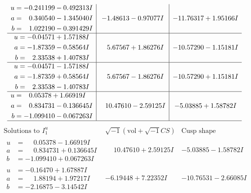 \documentclass[1p]{elsarticle_modified}
\theoremstyle{definition}
\newcommand{\I}{\sqrt{-1}}
\begin{document}
$$\begin{array}{c|c|c}
\begin{aligned}
u &= -0.241199 - 0.492313 I \\
a &= \phantom{-}0.340540 - 1.345040 I \\
b &= \phantom{-}1.022190 - 0.391429 I\end{aligned}
 & -1.48613 - 0.97077 I & -11.76317 + 1.95166 I \\ \hline\begin{aligned}
u &= -0.04571 + 1.57188 I \\
a &= -1.87359 - 0.58564 I \\
b &= \phantom{-}2.33538 + 1.40783 I\end{aligned}
 & \phantom{-}5.67567 + 1.86276 I & -10.57290 - 1.15181 I \\ \hline\begin{aligned}
u &= -0.04571 - 1.57188 I \\
a &= -1.87359 + 0.58564 I \\
b &= \phantom{-}2.33538 - 1.40783 I\end{aligned}
 & \phantom{-}5.67567 - 1.86276 I & -10.57290 + 1.15181 I \\ \hline\begin{aligned}
u &= \phantom{-}0.05378 + 1.66919 I \\
a &= \phantom{-}0.834731 - 0.136645 I \\
b &= -1.099410 - 0.067263 I\end{aligned}
 & \phantom{-}10.47610 - 2.59125 I & -5.03885 + 1.58782 I\\
 \hline 
 \end{array}$$\newpage$$\begin{array}{c|c|c}  
\text{Solutions to }I^u_{1}& \I (\text{vol} + \sqrt{-1}CS) & \text{Cusp shape}\\
 \hline 
\begin{aligned}
u &= \phantom{-}0.05378 - 1.66919 I \\
a &= \phantom{-}0.834731 + 0.136645 I \\
b &= -1.099410 + 0.067263 I\end{aligned}
 & \phantom{-}10.47610 + 2.59125 I & -5.03885 - 1.58782 I \\ \hline\begin{aligned}
u &= -0.16470 + 1.67887 I \\
a &= \phantom{-}1.88194 + 1.97217 I \\
b &= -2.16875 - 3.14542 I\end{aligned}
 & -6.19448 + 7.22352 I & -10.76531 - 2.66085 I \\ \hline\begin{aligned}

\end{aligned}
\end{array}$$
\end{document}
